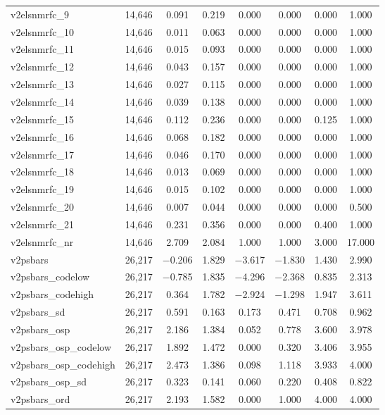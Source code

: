 \begin{table}[!htbp]
\begin{tabular}{@{\extracolsep{5pt}}lccccccc}
v2elsnmrfc\_9 & 14,646 & 0.091 & 0.219 & 0.000 & 0.000 & 0.000 & 1.000 \\ 
v2elsnmrfc\_10 & 14,646 & 0.011 & 0.063 & 0.000 & 0.000 & 0.000 & 1.000 \\ 
v2elsnmrfc\_11 & 14,646 & 0.015 & 0.093 & 0.000 & 0.000 & 0.000 & 1.000 \\ 
v2elsnmrfc\_12 & 14,646 & 0.043 & 0.157 & 0.000 & 0.000 & 0.000 & 1.000 \\ 
v2elsnmrfc\_13 & 14,646 & 0.027 & 0.115 & 0.000 & 0.000 & 0.000 & 1.000 \\ 
v2elsnmrfc\_14 & 14,646 & 0.039 & 0.138 & 0.000 & 0.000 & 0.000 & 1.000 \\ 
v2elsnmrfc\_15 & 14,646 & 0.112 & 0.236 & 0.000 & 0.000 & 0.125 & 1.000 \\ 
v2elsnmrfc\_16 & 14,646 & 0.068 & 0.182 & 0.000 & 0.000 & 0.000 & 1.000 \\ 
v2elsnmrfc\_17 & 14,646 & 0.046 & 0.170 & 0.000 & 0.000 & 0.000 & 1.000 \\ 
v2elsnmrfc\_18 & 14,646 & 0.013 & 0.069 & 0.000 & 0.000 & 0.000 & 1.000 \\ 
v2elsnmrfc\_19 & 14,646 & 0.015 & 0.102 & 0.000 & 0.000 & 0.000 & 1.000 \\ 
v2elsnmrfc\_20 & 14,646 & 0.007 & 0.044 & 0.000 & 0.000 & 0.000 & 0.500 \\ 
v2elsnmrfc\_21 & 14,646 & 0.231 & 0.356 & 0.000 & 0.000 & 0.400 & 1.000 \\ 
v2elsnmrfc\_nr & 14,646 & 2.709 & 2.084 & 1.000 & 1.000 & 3.000 & 17.000 \\ 
v2psbars & 26,217 & $-$0.206 & 1.829 & $-$3.617 & $-$1.830 & 1.430 & 2.990 \\ 
v2psbars\_codelow & 26,217 & $-$0.785 & 1.835 & $-$4.296 & $-$2.368 & 0.835 & 2.313 \\ 
v2psbars\_codehigh & 26,217 & 0.364 & 1.782 & $-$2.924 & $-$1.298 & 1.947 & 3.611 \\ 
v2psbars\_sd & 26,217 & 0.591 & 0.163 & 0.173 & 0.471 & 0.708 & 0.962 \\ 
v2psbars\_osp & 26,217 & 2.186 & 1.384 & 0.052 & 0.778 & 3.600 & 3.978 \\ 
v2psbars\_osp\_codelow & 26,217 & 1.892 & 1.472 & 0.000 & 0.320 & 3.406 & 3.955 \\ 
v2psbars\_osp\_codehigh & 26,217 & 2.473 & 1.386 & 0.098 & 1.118 & 3.933 & 4.000 \\ 
v2psbars\_osp\_sd & 26,217 & 0.323 & 0.141 & 0.060 & 0.220 & 0.408 & 0.822 \\ 
v2psbars\_ord & 26,217 & 2.193 & 1.582 & 0.000 & 1.000 & 4.000 & 4.000 \\ 

\end{tabular}
\end{table}
